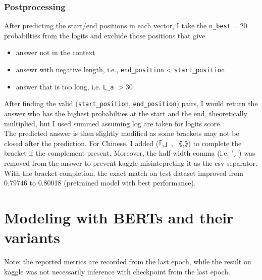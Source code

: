 \documentclass{homeworg}
\begin{document}
\subsubsection{Postprocessing}
After predicting the start/end positions in each vector, I take the \texttt{n\_best}$ = 20$ probabilties from the logits and exclude those positions that give 
\begin{itemize}
    \item answer not in the context
    \item ansewr with negative length, i.e., \verb|end_position| < \verb|start_position|
    \item answer that is too long, i.e. \verb|L_a| $> 30$
\end{itemize}
After finding the valid (\verb|start_position|, \verb|end_position|) pairs, I would return the answer who has the highest probabilties at the start and the end, theoretically multiplied, but I used summed assuming log are taken for logits score.\\
The predicted answer is then slightly modified as some brackets may not be closed after the prediction. For Chinese, I added (「,」, 《,》) to complete the bracket if the complement present. Moreover, the half-width comma (i.e. '\texttt{,}') was removed from the answer to prevent kaggle misintepreting it as the csv separator. With the bracket completion, the exact match on test dataset improved from 0.79746 to 0.80018 (pretrained model with best performance).
\newpage
\section{Modeling with BERTs and their variants}
Note: the reported metrics are recorded from the last epoch, while the result on kaggle was not necessarily inference with checkpoint from the last epoch. 
\end{document}
